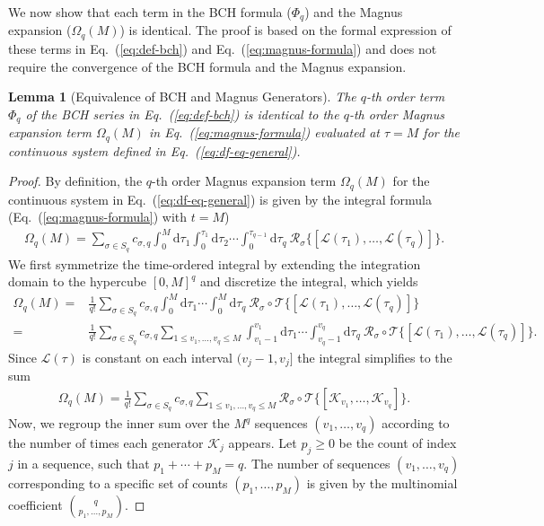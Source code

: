 \documentclass[11pt]{article}
\newtheorem{lemma}{Lemma}
\newcommand{\eq}[1]{(\ref{eq:#1})}
\renewcommand{\d}{\mathrm{d}}
\newcommand{\mc}{\mathcal}
\begin{document}
We now show that each term in the BCH formula ($\Phi_q$) and the Magnus expansion ($\Omega_q(M)$) is identical. The proof is based on the formal expression of these terms in Eq.~\eq{def-bch} and Eq.~\eq{magnus-formula} and does not require the convergence of the BCH formula and the Magnus expansion.  
\begin{lemma}[Equivalence of BCH and Magnus Generators]
\label{lem:magnus-bch-general}
The $q$-th order term $\Phi_q$ of the BCH series in Eq.~\eq{def-bch} is identical to the $q$-th order Magnus expansion term $\Omega_q(M)$ in Eq.~\eq{magnus-formula} evaluated at $\tau=M$ for the continuous system defined in Eq.~\eq{df-eq-general}.
\end{lemma}
\begin{proof}
    By definition, the $q$-th order Magnus expansion term $\Omega_q(M)$ for the continuous system in Eq.~\eq{df-eq-general} is given by the integral formula (Eq.~\eq{magnus-formula} with $t=M$)
    \begin{align}
         \Omega_q(M) = \sum_{\sigma\in S_q} c_{\sigma, q}  \int_{0}^{M} \d \tau_1 \int_{0}^{\tau_1}\d \tau_2 \cdots \int_{0}^{\tau_{q-1}}\d \tau_q ~\mc R_{\sigma}\big\{[\mc L(\tau_1), \ldots, \mc L(\tau_q)] \big\}. \nonumber
    \end{align}
    We first symmetrize the time-ordered integral by extending the integration domain to the hypercube $[0, M]^q$ and discretize the integral, which yields
    \begin{align*}
        \Omega_q(M) =& \frac{1}{ q!}\sum_{\sigma\in S_q} c_{\sigma, q}  \int_{0}^{M} \d \tau_1 \cdots \int_{0}^{M}\d \tau_q ~ \mc R_{\sigma} \circ \mc T\big\{[\mc L(\tau_1), \ldots, \mc L(\tau_q)]\big \} \\
         =&\frac{1}{ q!}\sum_{\sigma\in S_q} c_{\sigma, q} \sum_{ 1\le v_1,\ldots, v_q \le M} \int_{v_1-1}^{v_1} \d \tau_1 \cdots \int_{v_q-1}^{v_q}\d \tau_q ~ \mc R_{\sigma} \circ \mc T\big\{[\mc L(\tau_1), \ldots, \mc L(\tau_q)] \big\}.
    \end{align*}
    Since $\mc L(\tau)$ is constant on each interval $(v_j-1, v_j]$ the integral simplifies to the sum
    \begin{align}
        \Omega_q(M) = \frac{1}{ q!}\sum_{\sigma\in S_q} c_{\sigma, q} \sum_{ 1\le v_1,\ldots, v_q \le M} \mc R_{\sigma} \circ \mc T\big\{[\mc K_{v_1}, \ldots, \mc K_{v_q}] \big\}. \label{eq:magnus-general-midstep}
    \end{align}
    Now, we regroup the inner sum over the $M^q$ sequences $(v_1, \ldots, v_q)$ according to the number of times each generator $\mc K_j$ appears. Let $p_j \ge 0$ be the count of index $j$ in a sequence, such that $p_1 + \cdots + p_M = q$. The number of sequences $(v_1, \ldots, v_q)$ corresponding to a specific set of counts $(p_1, \ldots, p_M)$ is given by the multinomial coefficient $\binom{q}{p_1, \ldots, p_M}$.
    

\end{proof}
\end{document}
